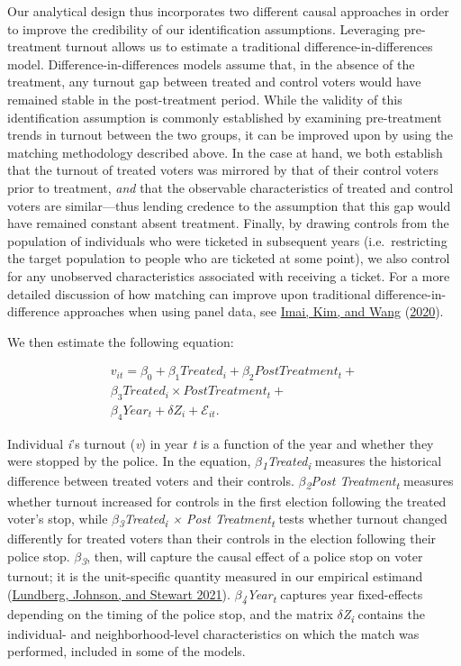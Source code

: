 \documentclass[
  12pt,
]{article}
\begin{document}
Our analytical design thus incorporates two different causal approaches in order to improve the credibility of our identification assumptions. Leveraging pre-treatment turnout allows us to estimate a traditional difference-in-differences model. Difference-in-differences models assume that, in the absence of the treatment, any turnout gap between treated and control voters would have remained stable in the post-treatment period. While the validity of this identification assumption is commonly established by examining pre-treatment trends in turnout between the two groups, it can be improved upon by using the matching methodology described above. In the case at hand, we both establish that the turnout of treated voters was mirrored by that of their control voters prior to treatment, \emph{and} that the observable characteristics of treated and control voters are similar---thus lending credence to the assumption that this gap would have remained constant absent treatment. Finally, by drawing controls from the population of individuals who were ticketed in subsequent years (i.e.~restricting the target population to people who are ticketed at some point), we also control for any unobserved characteristics associated with receiving a ticket. For a more detailed discussion of how matching can improve upon traditional difference-in-difference approaches when using panel data, see \protect\hyperlink{ref-Imai2020}{Imai, Kim, and Wang} (\protect\hyperlink{ref-Imai2020}{2020}).

We then estimate the following equation:

\begin{gather}
\label{eq:1}
v_{it}=\beta_0+\beta_1Treated_{i}+\beta_2Post Treatment_{t} + \nonumber \\
\beta_3Treated_{i}\times Post Treatment_{t} + \\
\beta_4Year_{t} + \delta{Z}_{i} + \mathcal{E}_{it}. \nonumber
\end{gather}

Individual \emph{i}'s turnout (\emph{v}) in year \emph{t} is a function of the year and whether they were stopped by the police. In the equation, \emph{\(\beta\)\textsubscript{1}Treated\textsubscript{i}} measures the historical difference between treated voters and their controls. \emph{\(\beta\)\textsubscript{2}Post Treatment\textsubscript{t}} measures whether turnout increased for controls in the first election following the treated voter's stop, while \emph{\(\beta\)\textsubscript{3}Treated\textsubscript{i} × Post Treatment\textsubscript{t}} tests whether turnout changed differently for treated voters than their controls in the election following their police stop. \emph{\(\beta\)\textsubscript{3}}, then, will capture the causal effect of a police stop on voter turnout; it is the unit-specific quantity measured in our empirical estimand (\protect\hyperlink{ref-Lundberg2021}{Lundberg, Johnson, and Stewart 2021}). \emph{\(\beta\)\textsubscript{4}Year\textsubscript{t}} captures year fixed-effects depending on the timing of the police stop, and the matrix \emph{\(\delta\)Z\textsubscript{i}} contains the individual- and neighborhood-level characteristics on which the match was performed, included in some of the models.
\end{document}
